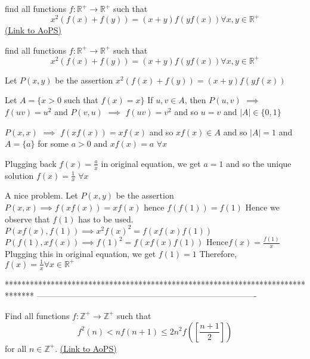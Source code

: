 \begin{problem}
	find all functions $f:\mathbb{R^+}\to\mathbb{R^+}$ such that \[x^2(f(x)+f(y))=(x+y)f(yf(x))\forall x,y\in\mathbb{R^+}\]
	\flushright \href{https://artofproblemsolving.com/community/c6h581727}{(Link to AoPS)}
\end{problem}



\begin{solution}
	\begin{tcolorbox}find all functions $f:\mathbb{R^+}\to\mathbb{R^+}$ such that \[x^2(f(x)+f(y))=(x+y)f(yf(x))\forall x,y\in\mathbb{R^+}\]\end{tcolorbox}
Let $P(x,y)$ be the assertion $x^2(f(x)+f(y))=(x+y)f(yf(x))$

Let $A=\{x>0$ such that $f(x)=x\}$
If $u,v\in A$, then $P(u,v)$ $\implies$ $f(uv)=u^2$ and $P(v,u)$ $\implies$ $f(uv)=v^2$ and so $u=v$ and $|A|\in\{0,1\}$

$P(x,x)$ $\implies$ $f(xf(x))=xf(x)$ and so $xf(x)\in A$ and so $|A|=1$ and $A=\{a\}$ for some $a>0$ and $xf(x)=a$ $\forall x$

Plugging back $f(x)=\frac ax$ in original equation, we get $a=1$ and so the unique solution $\boxed{f(x)=\frac 1x}$ $\forall x$
\end{solution}



\begin{solution}
	A nice problem.
Let $P(x,y)$ be the assertion 
$P(x,x)\implies f(xf(x))=xf(x)$ hence $f(f(1))=f(1)$
Hence we observe that $f(1)$ has to be used.
$P(xf(x),f(1))\implies x^2f(x)^2=f(xf(x)f(1))$
$P(f(1),xf(x)) \implies f(1)^2=f(xf(x)f(1))$
Hence$f(x)=\frac{f(1)}x$
Plugging this in original equation, we get $f(1)=1$
Therefore, $f(x)=\frac {1}{x}\forall x\in\mathbb{R}^+$
\end{solution}
*******************************************************************************
-------------------------------------------------------------------------------

\begin{problem}
	Find all functions $f:{{\mathbb{Z}}^{+}}\to {{\mathbb{Z}}^{+}}$ such that
\[{{f}^{2}}(n)<nf(n+1)\le 2{{n}^{2}}f\left( \left[ \frac{n+1}{2} \right] \right)\] for all $n\in {{\mathbb{Z}}^{+}}$.
	\flushright \href{https://artofproblemsolving.com/community/c6h581741}{(Link to AoPS)}
\end{problem}



